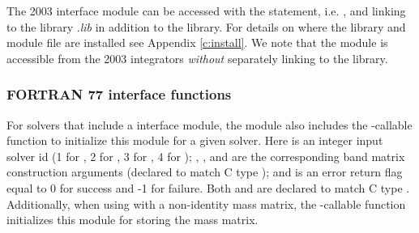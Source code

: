 The {\F} 2003 {\sunmatband} interface module can be accessed with the 
statement, i.e. , and linking to the library
.{\em lib} in addition to the {\CC} library.
For details on where the library and module file
 are installed see Appendix \ref{c:install}.
We note that the module is accessible from the {\F} 2003 {\sundials} integrators
\textit{without} separately linking to the
 library.

\subsubsection*{FORTRAN 77 interface functions}
For solvers that include a {\F} interface module, the {\sunmatband}
module also includes the {\F}-callable
function  to initialize
this {\sunmatband} module for a given {\sundials} solver.
Here  is an integer input solver id (1 for {\cvode}, 2 for {\ida}, 3
for {\kinsol}, 4 for {\arkode}); , , and 
are the corresponding band matrix construction arguments (declared
to match C type ); and  is an error return flag
equal to 0 for success and -1 for failure. Both  and 
are declared to match C type . Additionally, when using
{\arkode} with a non-identity mass matrix, the {\F}-callable
function  initializes
this {\sunmatband} module for storing the mass matrix.
